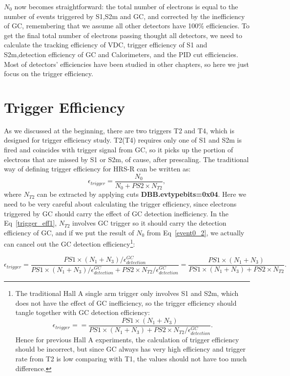 \documentclass[a4paper,10.5pt]{article}
\begin{document}
 $N_{0}$ now becomes straightforward: the total number of electrons is equal to the number of events triggered by S1,S2m and GC, and corrected by the inefficiency of GC, remembering that we assume all other detectors have 100\% efficiencies. To get the final total number of electrons passing thought all detectors, we need to calculate the tracking efficiency of VDC, trigger efficiency of S1 and S2m,detection efficiency of GC and Calorimeters, and the PID cut efficiencies. Most of detectors' efficiencies have been studied in other chapters, so here we just focus on the trigger efficiency.

\section{Trigger Efficiency}
 As we discussed at the beginning, there are two triggers T2 and T4, which is designed for trigger efficiency study. T2(T4) requires only one of S1 and S2m is fired and coincides with trigger signal from GC, so it picks up the portion of electrons that are missed by S1 or S2m, of cause, after prescaling. The traditional way of defining trigger efficiency for HRS-R can be written as:
 \begin{equation}
 \epsilon_{trigger} = \frac{N_{0}}{N_{0}+PS2\times N_{T2}},
 \label{trigger_eff1}
\end{equation}
where $N_{T2}$ can be extracted by applying cuts \textbf{DBB.evtypebits=0x04}. Here we need to be very careful about calculating the trigger efficiency, since electrons triggered by GC should carry the effect of GC detection inefficiency. In the Eq~\ref{trigger_eff1}, $N_{T2}$ involves GC trigger so it should carry the detection efficiency of GC, and if we put the result of $N_{0}$ from Eq~\ref{event0_2}, we actually can cancel out the GC detection efficiency\footnote{The traditional Hall A single arm trigger only involves S1 and S2m, which does not have the effect of GC inefficiency, so the trigger efficiency should tangle together with GC detection efficiency:
\begin{equation}
 \epsilon_{trigger} = =\frac{PS1\times(N_{1}+N_{3})}{PS1\times(N_{1}+N_{3})+PS2\times N_{T2}/\epsilon_{detection}^{GC}}.
\end{equation}
Hence for previous Hall A experiments, the calculation of trigger efficiency should be incorrect, but since GC always has very high efficiency and trigger rate from T2 is low comparing with T1, the values should not have too much difference.}:

\begin{equation}
 \epsilon_{trigger} = \frac{PS1\times(N_{1}+N_{3})/\epsilon_{detection}^{GC}}{PS1\times(N_{1}+N_{3})/\epsilon_{detection}^{GC}+PS2\times N_{T2}/\epsilon_{detection}^{GC}}=\frac{PS1\times(N_{1}+N_{3})}{PS1\times(N_{1}+N_{3})+PS2\times N_{T2}}.
\end{equation}
\end{document}
